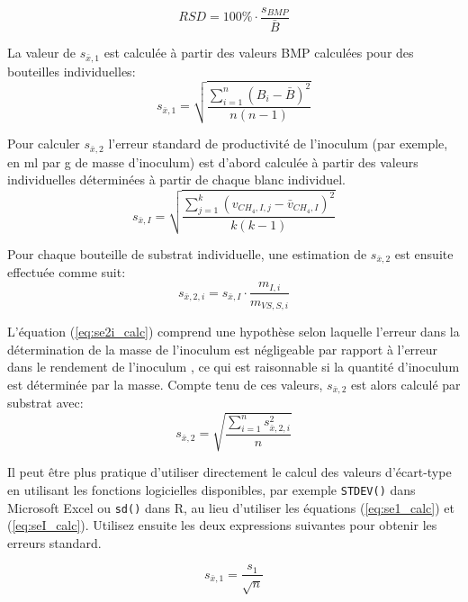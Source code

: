 \documentclass[]{article}
\begin{document}
\begin{equation}
  \label{eq:rsd}
  RSD = 100\% \cdot \frac{s_{BMP}} {\bar{B}}
\end{equation}

La valeur de $s_{\bar{x},1}$ est calculée à partir des valeurs BMP calculées pour des bouteilles individuelles:
\begin{equation}
  \label{eq:se1_calc}
  s_{\bar{x},1} = \sqrt{ \frac{\sum_{i=1} ^n(B_i - \bar{B})^2} {n(n - 1)} }
\end{equation}

Pour calculer $s_{\bar{x},2}$ l'erreur standard de productivité de l'inoculum  (par exemple, en ml par g de masse d'inoculum) est d'abord calculée à partir des valeurs individuelles déterminées à partir de chaque blanc individuel.
\begin{equation}
  \label{eq:seI_calc}
  s_{\bar{x},I} = \sqrt{\frac{\sum_{j=1} ^k (v_{CH_4, I, j} - \bar{v}_{CH_4, I})^2} {k(k -1)} }
\end{equation}

Pour chaque bouteille de substrat individuelle, une estimation de $s_{\bar{x},2}$ est ensuite effectuée comme suit:
\begin{equation}
  \label{eq:se2i_calc}
  s_{\bar{x},2,i} = s_{\bar{x},I} \cdot \frac{m_{I, i}} {m_{VS, S, i}}
\end{equation}

L'équation (\ref{eq:se2i_calc}) comprend une hypothèse selon laquelle l'erreur dans la détermination de la masse de l'inoculum est négligeable par rapport à l'erreur dans le rendement de l'inoculum , ce qui est raisonnable si la quantité d'inoculum est déterminée par la masse.
Compte tenu de ces valeurs, $s_{\bar{x},2}$ est alors calculé par substrat avec:
\begin{equation}
  \label{eq:se2_calc}
  s_{\bar{x},2} = \sqrt{\frac{\sum_{i=1} ^n s_{\bar{x},2,i}^2} {n}}
\end{equation}

Il peut être plus pratique d'utiliser directement le calcul des valeurs d'écart-type en utilisant les fonctions logicielles disponibles, par exemple \texttt{STDEV()} dans Microsoft Excel ou \texttt{sd()} dans R, au lieu d'utiliser les équations (\ref{eq:se1_calc}) et (\ref{eq:seI_calc}).
Utilisez ensuite les deux expressions suivantes pour obtenir les erreurs standard.

\begin{equation}
  \label{eq:se1_calcb}
  s_{\bar{x},1} = \frac{s_{1} } {\sqrt{n}}
\end{equation}
\end{document}
